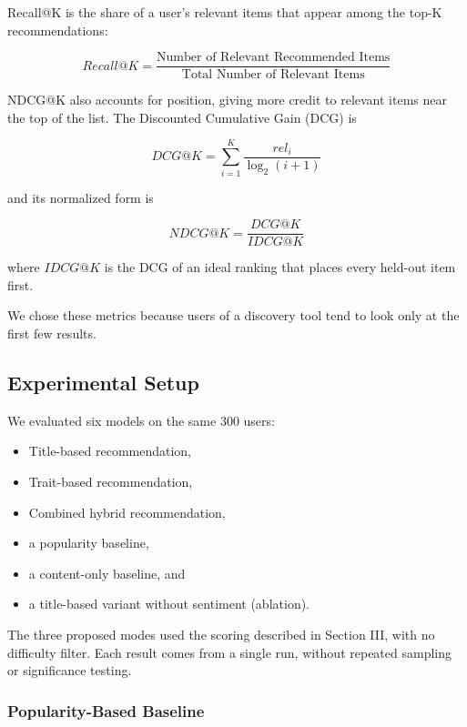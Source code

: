 \documentclass[conference]{IEEEtran}
\begin{document}
Recall@K is the share of a user's relevant items that appear among the top-K recommendations:

\begin{equation}
Recall@K =
\frac{\text{Number of Relevant Recommended Items}}
{\text{Total Number of Relevant Items}}
\end{equation}

NDCG@K also accounts for position, giving more credit to relevant items near the top of the list. The Discounted Cumulative Gain (DCG) is

\begin{equation}
DCG@K =
\sum_{i=1}^{K}
\frac{rel_i}{\log_2(i+1)}
\end{equation}

and its normalized form is

\begin{equation}
NDCG@K =
\frac{DCG@K}{IDCG@K}
\end{equation}

where $IDCG@K$ is the DCG of an ideal ranking that places every held-out item first.

We chose these metrics because users of a discovery tool tend to look only at the first few results.

\subsection{Experimental Setup}

We evaluated six models on the same 300 users:
\begin{itemize}
    \item Title-based recommendation,
    \item Trait-based recommendation,
    \item Combined hybrid recommendation,
    \item a popularity baseline,
    \item a content-only baseline, and
    \item a title-based variant without sentiment (ablation).
\end{itemize}

The three proposed modes used the scoring described in Section III, with no difficulty filter. Each result comes from a single run, without repeated sampling or significance testing.

\subsubsection{Popularity-Based Baseline}
\end{document}
